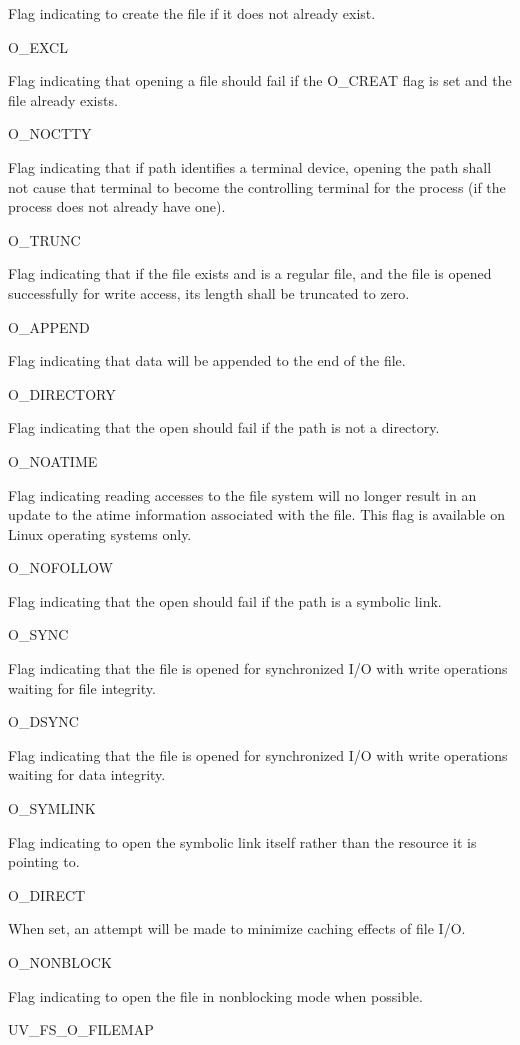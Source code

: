 Flag indicating to create the file if it does not already exist.

O\_EXCL

Flag indicating that opening a file should fail if the O\_CREAT flag is
set and the file already exists.

O\_NOCTTY

Flag indicating that if path identifies a terminal device, opening the
path shall not cause that terminal to become the controlling terminal
for the process (if the process does not already have one).

O\_TRUNC

Flag indicating that if the file exists and is a regular file, and the
file is opened successfully for write access, its length shall be
truncated to zero.

O\_APPEND

Flag indicating that data will be appended to the end of the file.

O\_DIRECTORY

Flag indicating that the open should fail if the path is not a
directory.

O\_NOATIME

Flag indicating reading accesses to the file system will no longer
result in an update to the atime information associated with the file.
This flag is available on Linux operating systems only.

O\_NOFOLLOW

Flag indicating that the open should fail if the path is a symbolic
link.

O\_SYNC

Flag indicating that the file is opened for synchronized I/O with write
operations waiting for file integrity.

O\_DSYNC

Flag indicating that the file is opened for synchronized I/O with write
operations waiting for data integrity.

O\_SYMLINK

Flag indicating to open the symbolic link itself rather than the
resource it is pointing to.

O\_DIRECT

When set, an attempt will be made to minimize caching effects of file
I/O.

O\_NONBLOCK

Flag indicating to open the file in nonblocking mode when possible.

UV\_FS\_O\_FILEMAP

